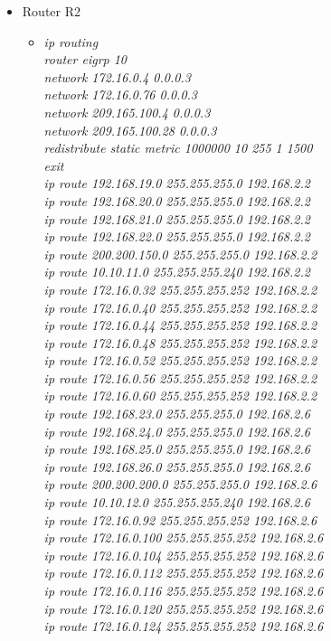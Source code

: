 \documentclass[12pt,a4paper]{report}
\begin{document}
\begin{itemize}
\begin{itemize}
\begin{itemize}
          \end{itemize}
             \item Router R2
        \begin{itemize}
         \item \textit{ip routing\\
router eigrp 10\\
network 172.16.0.4 0.0.0.3\\
network 172.16.0.76 0.0.0.3\\
network 209.165.100.4 0.0.0.3\\
network 209.165.100.28 0.0.0.3\\
redistribute static metric 1000000 10 255 1 1500\\
exit\\
ip route 192.168.19.0 255.255.255.0 192.168.2.2\\
ip route 192.168.20.0 255.255.255.0 192.168.2.2\\
ip route 192.168.21.0 255.255.255.0 192.168.2.2\\
ip route 192.168.22.0 255.255.255.0 192.168.2.2\\
ip route 200.200.150.0 255.255.255.0 192.168.2.2\\
ip route 10.10.11.0 255.255.255.240 192.168.2.2\\
ip route 172.16.0.32 255.255.255.252 192.168.2.2\\
ip route 172.16.0.40 255.255.255.252 192.168.2.2\\
ip route 172.16.0.44 255.255.255.252 192.168.2.2\\
ip route 172.16.0.48 255.255.255.252 192.168.2.2\\
ip route 172.16.0.52 255.255.255.252 192.168.2.2\\
ip route 172.16.0.56 255.255.255.252 192.168.2.2\\
ip route 172.16.0.60 255.255.255.252 192.168.2.2\\
ip route 192.168.23.0 255.255.255.0 192.168.2.6\\
ip route 192.168.24.0 255.255.255.0 192.168.2.6\\
ip route 192.168.25.0 255.255.255.0 192.168.2.6 \\
ip route 192.168.26.0 255.255.255.0 192.168.2.6 \\
ip route 200.200.200.0 255.255.255.0 192.168.2.6 \\
ip route 10.10.12.0 255.255.255.240 192.168.2.6\\
ip route 172.16.0.92 255.255.255.252 192.168.2.6 \\
ip route 172.16.0.100 255.255.255.252 192.168.2.6 \\
ip route 172.16.0.104 255.255.255.252 192.168.2.6\\
ip route 172.16.0.112 255.255.255.252 192.168.2.6\\
ip route 172.16.0.116 255.255.255.252 192.168.2.6\\
ip route 172.16.0.120 255.255.255.252 192.168.2.6 \\
ip route 172.16.0.124 255.255.255.252 192.168.2.6\\}
         

\end{itemize}
\end{itemize}
\end{itemize}
\end{document}
